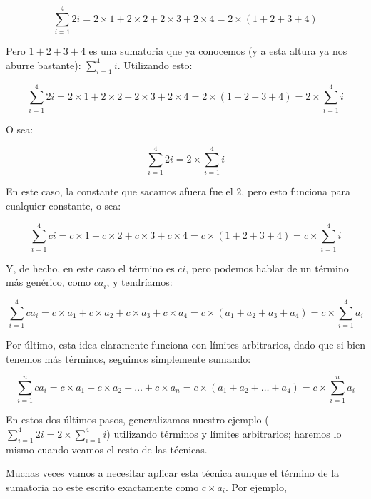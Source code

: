 \begin{equation*}
\sum_{i=1}^4{2i} = 2 \times 1 +2 \times 2+2 \times 3+2 \times 4 = 2 \times (1 + 2 + 3 + 4)
\end{equation*}

Pero $ 1 + 2 + 3 + 4 $  es una sumatoria que ya conocemos (y a esta altura ya nos aburre bastante): $\sum_{i=1}^4{i}$. Utilizando esto:

\begin{equation*}
\sum_{i=1}^4{2i} = 2 \times 1 +2 \times 2+2 \times 3+2 \times 4 = 2 \times (1 + 2 + 3 + 4) = 2 \times \sum_{i=1}^4{i}
\end{equation*}

O sea:

\begin{equation*}
\sum_{i=1}^4{2i} = 2 \times \sum_{i=1}^4{i}
\end{equation*}

En este caso, la constante que sacamos afuera fue el $2$, pero esto funciona para cualquier constante, o sea:

\begin{equation*}
\sum_{i=1}^4{c i} = c \times 1 +c \times 2+c \times 3+c \times 4 = c \times (1 + 2 + 3 + 4) = c \times \sum_{i=1}^4{i}
\end{equation*}

Y, de hecho, en este caso el término es $c i$, pero podemos hablar de un término más genérico, como $c a_i$, y tendríamos:

\begin{equation*}
\sum_{i=1}^4{c a_i} = c \times a_1 +c \times a_2+c \times a_3+c \times a_4 = c \times (a_1 + a_2 + a_3 + a_4) = c \times \sum_{i=1}^4{a_i}
\end{equation*}

Por último, esta idea claramente funciona con límites arbitrarios, dado que si bien tenemos más términos, seguimos simplemente sumando:

\begin{equation*}
\sum_{i=1}^n{c a_i} = c \times a_1 +c \times a_2+\dots+c \times a_n= c \times (a_1 + a_2 + \dots + a_4) = c \times \sum_{i=1}^n{a_i}
\end{equation*}

En estos dos últimos pasos, generalizamos nuestro ejemplo ($\sum_{i=1}^4{2i} = 2 \times \sum_{i=1}^4{i}$) utilizando términos y límites arbitrarios; haremos lo mismo cuando veamos el resto de las técnicas.

Muchas veces vamos a necesitar aplicar esta técnica aunque el término de la sumatoria no este escrito exactamente como $c \times a_i$. Por ejemplo,  

